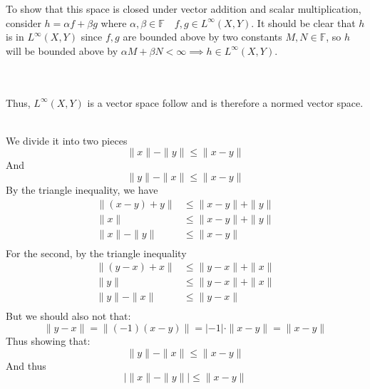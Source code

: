 \documentclass[letterpaper,12pt]{article}
\theoremstyle{definition}
\begin{document}
To show that this space is closed under vector addition and scalar multiplication, consider $h = \alpha f + \beta g$ where $\alpha,\beta \in \mathbb{F} \quad f,g \in L^\infty(X,Y)$. It should be clear that $h$ is in $L^\infty(X,Y)$ since $f,g$ are bounded above by two constants $M,N \in \mathbb{\mathbb{F}}$, so $h$ will be bounded above by $\alpha M + \beta N < \infty \implies h \in  L^\infty(X,Y)$.\\\\\

Thus,  $L^{\infty}(X,Y)$ is a vector space follow and is therefore a normed vector space. 


\\

We divide it into two pieces
\[ \|x\| - \|y\| \leq \|x-y\|  \]
And
\[ \|y\| - \|x\| \leq \|x-y\|  \]
By the triangle inequality, we have
\begin{align*}
    \|(x-y) + y\| &\leq \|x-y\| + \|y\| \\
    \|x\| &\leq \|x-y\| + \|y\| \\
    \|x\| - \|y\| &\leq \|x-y\|  \\
\end{align*}
For the second, by the triangle inequality
\begin{align*}
    \|(y-x) + x\| &\leq \|y-x\| + \|x\| \\
    \|y\| &\leq \|y-x\| + \|x\| \\
    \|y\| - \|x\|  &\leq \|y-x\|\\
\end{align*}
But we should also not that:
\[ \|y-x\| = \|(-1)(x-y)\| = |-1|\cdot \|x-y\| = \|x-y\|  \]
Thus showing that:
\[ \|y\| - \|x\|  \leq \|x-y\| \]
And thus
\[ | \|x\| - \|y\|| \leq \|x-y\|  \]
\end{document}
